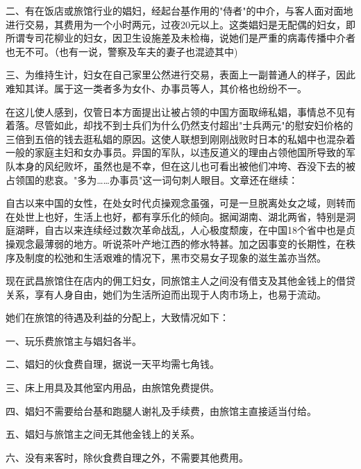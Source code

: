 \documentclass[12pt,UTF8]{ctexbook}
\begin{document}
二、有在饭店或旅馆行业的娼妇，经起台基作用的"侍者"的中介，与客人面对面地进行交易，其费用为一个小时两元，过夜20元以上。这类娼妇是无配偶的妇女，即所谓专司花柳业的妇女，因卫生设施差及未检梅，说她们是严重的病毒传播中介者也无不可。（也有一说，警察及车夫的妻子也混迹其中)



三、为维持生计，妇女在自己家里公然进行交易，表面上一副普通人的样子，因此难知其详。属于这一类者多为女仆、办事员等人，其价格也纷纷不一。





在这儿使人感到，仅管日本方面提出让被占领的中国方面取缔私娼，事情总不见有着落。尽管如此，却找不到士兵们为什么仍然支付超出"士兵两元"的慰安妇价格的三倍到五倍的钱去逛私娼的原因。这使人联想到刚刚战败时日本的私娼中也混杂着一般的家庭主妇和女办事员。异国的军队，以违反道义的理由占领他国所导致的军队本身的风纪败坏，虽然也是不幸，但在这儿也可看出被他们冲垮、吞没下去的被占领国的悲哀。"多为……办事员"这一词句刺人眼目。文章还在继续：



自古以来中国的女性，在处女时代贞操观念虽强，可是一旦脱离处女之域，则转而在处世上也好，生活上也好，都有享乐化的倾向。据闻湖南、湖北两省，特别是洞庭湖畔，自古以来连续经过数次革命战乱，人心极度颓废，在中国18个省中也是贞操观念最薄弱的地方。听说茶叶产地江西的修水特甚。加之因事变的长期性，在秩序及制度的松弛和生活艰难的情况下，黑市交易女子现象的滋生盖亦当然。



现在武昌旅馆住在店内的佣工妇女，同旅馆主人之间没有借支及其他金钱上的借贷关系，享有人身自由，她们为生活所迫而出现于人肉市场上，也易于流动。



她们在旅馆的待遇及利益的分配上，大致情况如下：



一、玩乐费旅馆主与娼妇各半。



二、娼妇的伙食费自理，据说一天平均需七角钱。



三、床上用具及其他室内用品，由旅馆免费提供。



四、娼妇不需要给台基和跑腿人谢礼及手续费，由旅馆主直接适当付给。



五、娼妇与旅馆主之间无其他金钱上的关系。



六、没有来客时，除伙食费自理之外，不需要其他费用。
\end{document}
